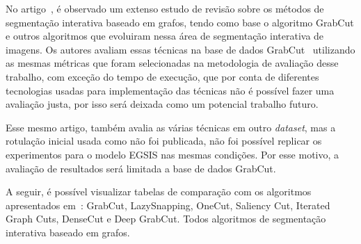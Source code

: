 No artigo~\cite{wang2023review}, é observado um extenso estudo de
revisão sobre os métodos de segmentação interativa baseado em grafos,
tendo como base o algoritmo GrabCut e outros algoritmos que evoluiram
nessa área de segmentação interativa de imagens. Os autores avaliam
essas técnicas na base de dados GrabCut~\cite{rother2004grabcut}
utilizando as mesmas métricas que foram selecionadas na metodologia de
avaliação desse trabalho, com exceção do tempo de execução, que por
conta de diferentes tecnologias usadas para implementação das técnicas
não é possível fazer uma avaliação justa, por isso será deixada como
um potencial trabalho futuro.

Esse mesmo artigo, também avalia as várias técnicas em outro \textit{dataset},
mas a rotulação inicial usada como não foi publicada, não foi possível
replicar os experimentos para o modelo \gls{EGSIS} nas mesmas
condições. Por esse motivo, a avaliação de resultados será limitada a
base de dados GrabCut.

A seguir, é possível visualizar tabelas de comparação com os
algoritmos apresentados em~\cite{wang2023review}: GrabCut,
LazySnapping, OneCut, Saliency Cut, Iterated Graph Cuts, DenseCut e
Deep GrabCut. Todos algoritmos de segmentação interativa baseado em grafos.


